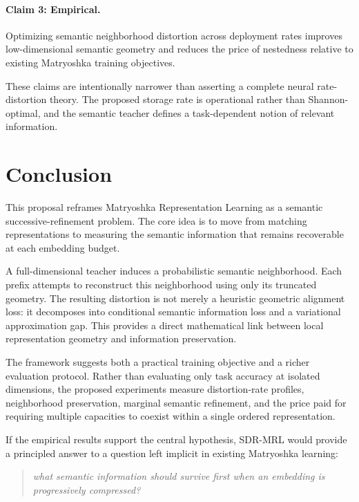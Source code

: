 \documentclass[11pt]{article}
\begin{document}
\paragraph{Claim 3: Empirical.}
Optimizing semantic neighborhood distortion across deployment rates improves low-dimensional semantic geometry and reduces the price of nestedness relative to existing Matryoshka training objectives.

These claims are intentionally narrower than asserting a complete neural rate-distortion theory.
The proposed storage rate is operational rather than Shannon-optimal, and the semantic teacher defines a task-dependent notion of relevant information.


\section{Conclusion}

This proposal reframes Matryoshka Representation Learning as a semantic successive-refinement problem.
The core idea is to move from matching representations to measuring the semantic information that remains recoverable at each embedding budget.

A full-dimensional teacher induces a probabilistic semantic neighborhood.
Each prefix attempts to reconstruct this neighborhood using only its truncated geometry.
The resulting distortion is not merely a heuristic geometric alignment loss: it decomposes into conditional semantic information loss and a variational approximation gap.
This provides a direct mathematical link between local representation geometry and information preservation.

The framework suggests both a practical training objective and a richer evaluation protocol.
Rather than evaluating only task accuracy at isolated dimensions, the proposed experiments measure distortion-rate profiles, neighborhood preservation, marginal semantic refinement, and the price paid for requiring multiple capacities to coexist within a single ordered representation.

If the empirical results support the central hypothesis, SDR-MRL would provide a principled answer to a question left implicit in existing Matryoshka learning:
\begin{quote}
\emph{
what semantic information should survive first when an embedding is progressively compressed?
}
\end{quote}
\end{document}
